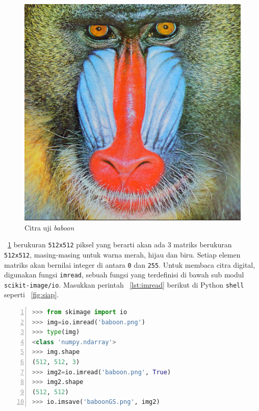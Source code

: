 \begin{figure}[h!]
  \begin{center}
    \includegraphics{pics/baboon.png}
    \caption{Citra uji \textit{baboon}}
    \label{fig:baboon}
  \end{center}
\end{figure}

\figurename~\ref{fig:baboon} berukuran \texttt{512x512} piksel yang berarti akan ada 3 matriks berukuran \texttt{512x512}, masing-masing untuk warna merah, hijau dan biru. Setiap elemen matriks akan bernilai integer di antara \texttt{0} dan \texttt{255}. Untuk membaca citra digital, digunakan fungsi \texttt{imread}, sebuah fungsi yang terdefinisi di bawah sub modul \texttt{scikit-image/io}. Masukkan perintah \lstlistingname~\ref{lst:imread} berikut di Python \texttt{shell} seperti \figurename~\ref{fig:siap}. 

\scriptsize
\begin{lstlisting}[language=python, numbers=left, numberstyle=\tiny, caption=Membaca/membuka citra, showstringspaces=false, label=lst:imread]
>>> from skimage import io
>>> img=io.imread('baboon.png')
>>> type(img)
<class 'numpy.ndarray'>
>>> img.shape
(512, 512, 3)
>>> img2=io.imread('baboon.png', True)
>>> img2.shape
(512, 512)
>>> io.imsave('baboonGS.png', img2)

\end{lstlisting}
\normalsize


